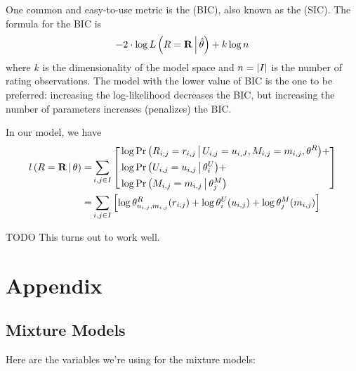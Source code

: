 \documentclass{article}
\begin{document}
One common and easy-to-use metric is the  (BIC), also known as the  (SIC). The formula for the BIC is
\begin{align}
-2 \cdot \log {\ensuremath{ L \left( R = {\bf R} \,\middle|\, \hat{\theta} \right) }} + k \log n
\end{align}
where $k$ is the dimensionality of the model space and $n = {\lvert I \rvert}$
is the number of rating observations. The model with the lower value
of BIC is the one to be preferred: increasing the log-likelihood
decreases the BIC, but increasing the number of parameters
increases (penalizes) the BIC.

In our model, we have 
\begin{align}
{\ensuremath{ l \left( R = {\bf R} \,\middle|\, \theta \right) }}
  =& \sum_{i,j \in I} \left[
    \begin{aligned}
      & \log {{\Pr \left(  R_{i,j} = r_{i,j} \,\middle|\, U_{i,j} = u_{i,J}, M_{i,j} = m_{i,j},
        \theta^R  \right)}} + \\
      & \log {{\Pr \left(  U_{i,j} = u_{i,j} \,\middle|\, \theta^U_i  \right)}} + \\
      & \log {{\Pr \left(  M_{i,j} = m_{i,j} \,\middle|\, \theta^M_j  \right)}}
    \end{aligned}
  \right] \\
  =& \sum_{i,j \in I} \left[
    \log \theta^R_{u_{i,j},m_{i,j}}(r_{i,j}) +
    \log \theta^U_i(u_{i,j}) +
    \log \theta^M_j(m_{i,j})
  \right] \\
\end{align}

TODO This turns out to work well.



%



\section{Appendix}

\subsection{Mixture Models}

Here are the variables we're using for the mixture models:
\end{document}
